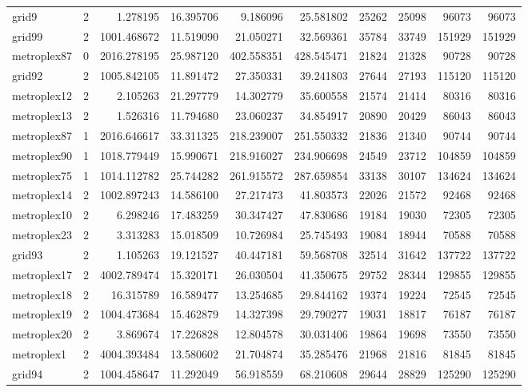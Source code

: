 \begin{longtable}{|l|r|r|r|r|r|r|r|r|r|}
grid9 & 2 & 1.278195 & 16.395706 & 9.186096 & 25.581802 & 25262 & 25098 & 96073 & 96073 \\
grid99 & 2 & 1001.468672 & 11.519090 & 21.050271 & 32.569361 & 35784 & 33749 & 151929 & 151929 \\
metroplex87 & 0 & 2016.278195 & 25.987120 & 402.558351 & 428.545471 & 21824 & 21328 & 90728 & 90728 \\
grid92 & 2 & 1005.842105 & 11.891472 & 27.350331 & 39.241803 & 27644 & 27193 & 115120 & 115120 \\
metroplex12 & 2 & 2.105263 & 21.297779 & 14.302779 & 35.600558 & 21574 & 21414 & 80316 & 80316 \\
metroplex13 & 2 & 1.526316 & 11.794680 & 23.060237 & 34.854917 & 20890 & 20429 & 86043 & 86043 \\
metroplex87 & 1 & 2016.646617 & 33.311325 & 218.239007 & 251.550332 & 21836 & 21340 & 90744 & 90744 \\
metroplex90 & 1 & 1018.779449 & 15.990671 & 218.916027 & 234.906698 & 24549 & 23712 & 104859 & 104859 \\
metroplex75 & 1 & 1014.112782 & 25.744282 & 261.915572 & 287.659854 & 33138 & 30107 & 134624 & 134624 \\
metroplex14 & 2 & 1002.897243 & 14.586100 & 27.217473 & 41.803573 & 22026 & 21572 & 92468 & 92468 \\
metroplex10 & 2 & 6.298246 & 17.483259 & 30.347427 & 47.830686 & 19184 & 19030 & 72305 & 72305 \\
metroplex23 & 2 & 3.313283 & 15.018509 & 10.726984 & 25.745493 & 19084 & 18944 & 70588 & 70588 \\
grid93 & 2 & 1.105263 & 19.121527 & 40.447181 & 59.568708 & 32514 & 31642 & 137722 & 137722 \\
metroplex17 & 2 & 4002.789474 & 15.320171 & 26.030504 & 41.350675 & 29752 & 28344 & 129855 & 129855 \\
metroplex18 & 2 & 16.315789 & 16.589477 & 13.254685 & 29.844162 & 19374 & 19224 & 72545 & 72545 \\
metroplex19 & 2 & 1004.473684 & 15.462879 & 14.327398 & 29.790277 & 19031 & 18817 & 76187 & 76187 \\
metroplex20 & 2 & 3.869674 & 17.226828 & 12.804578 & 30.031406 & 19864 & 19698 & 73550 & 73550 \\
metroplex1 & 2 & 4004.393484 & 13.580602 & 21.704874 & 35.285476 & 21968 & 21816 & 81845 & 81845 \\
grid94 & 2 & 1004.458647 & 11.292049 & 56.918559 & 68.210608 & 29644 & 28829 & 125290 & 125290 \\

\end{longtable}
